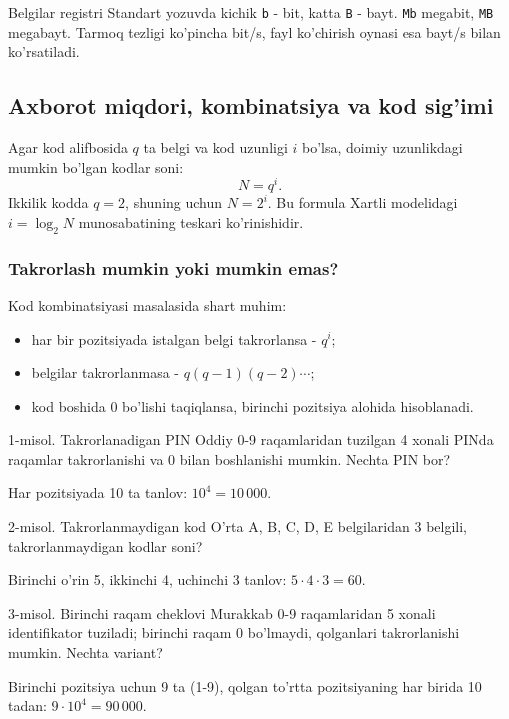 \documentclass[11pt,a4paper,oneside]{book}
\newcommand{\code}[1]{\texttt{#1}}
\newcommand{\difficulty}[1]{\hfill\textcolor{Muted}{\scriptsize\sffamily #1}}
\begin{document}
\begin{warningbox}{Belgilar registri}
Standart yozuvda kichik \code{b} - bit, katta \code{B} - bayt. \code{Mb} megabit, \code{MB} megabayt. Tarmoq tezligi ko'pincha bit/s, fayl ko'chirish oynasi esa bayt/s bilan ko'rsatiladi.
\end{warningbox}
\subsection{Axborot miqdori, kombinatsiya va kod sig'imi}
Agar kod alifbosida $q$ ta belgi va kod uzunligi $i$ bo'lsa, doimiy uzunlikdagi mumkin bo'lgan kodlar soni:
\[
N=q^i.
\]
Ikkilik kodda $q=2$, shuning uchun $N=2^i$. Bu formula Xartli modelidagi $i=\log_2N$ munosabatining teskari ko'rinishidir.

\subsubsection{Takrorlash mumkin yoki mumkin emas?}
Kod kombinatsiyasi masalasida shart muhim:
\begin{itemize}
\item har bir pozitsiyada istalgan belgi takrorlansa - $q^i$;
\item belgilar takrorlanmasa - $q(q-1)(q-2)\cdots$;
\item kod boshida 0 bo'lishi taqiqlansa, birinchi pozitsiya alohida hisoblanadi.
\end{itemize}

\begin{examplebox}{1-misol. Takrorlanadigan PIN \difficulty{Oddiy}}
0-9 raqamlaridan tuzilgan 4 xonali PINda raqamlar takrorlanishi va 0 bilan boshlanishi mumkin. Nechta PIN bor?
\begin{solutionbox}
Har pozitsiyada 10 ta tanlov: $10^4=10\,000$.
\end{solutionbox}
\end{examplebox}

\begin{examplebox}{2-misol. Takrorlanmaydigan kod \difficulty{O'rta}}
A, B, C, D, E belgilaridan 3 belgili, takrorlanmaydigan kodlar soni?
\begin{solutionbox}
Birinchi o'rin 5, ikkinchi 4, uchinchi 3 tanlov: $5\cdot4\cdot3=60$.
\end{solutionbox}
\end{examplebox}

\begin{examplebox}{3-misol. Birinchi raqam cheklovi \difficulty{Murakkab}}
0-9 raqamlaridan 5 xonali identifikator tuziladi; birinchi raqam 0 bo'lmaydi, qolganlari takrorlanishi mumkin. Nechta variant?
\begin{solutionbox}
Birinchi pozitsiya uchun 9 ta (1-9), qolgan to'rtta pozitsiyaning har birida 10 tadan: $9\cdot10^4=90\,000$.
\end{solutionbox}
\end{examplebox}
\end{document}
